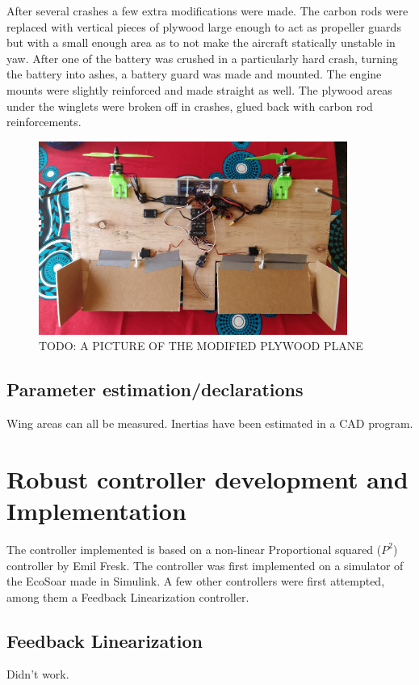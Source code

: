 \documentclass{article}
\begin{document}
After several crashes a few extra modifications were made.
The carbon rods were replaced with vertical pieces of plywood large enough to act as propeller guards but with a small enough area as to not make the aircraft statically unstable in yaw.
After one of the battery was crushed in a particularly hard crash, turning the battery into ashes, a battery guard was made and mounted.
The engine mounts were slightly reinforced and made straight as well.
The plywood areas under the winglets were broken off in crashes, glued back with carbon rod reinforcements.

\begin{figure}
    \center
    \includegraphics[width=0.9\textwidth]{FlyingBoard.jpg}
    \caption{TODO: A PICTURE OF THE MODIFIED PLYWOOD PLANE}
\end{figure}


\subsection{Parameter estimation/declarations}
Wing areas can all be measured. Inertias have been estimated in a CAD program.


\section{\textbf{Robust controller development and Implementation}}

The controller implemented is based on a non-linear Proportional squared ($P^2$) controller by Emil Fresk\cite{P2}.
The controller was first implemented on a simulator of the EcoSoar made in Simulink.
A few other controllers were first attempted, among them a Feedback Linearization controller.

\subsection{Feedback Linearization}
Didn't work.
\end{document}

